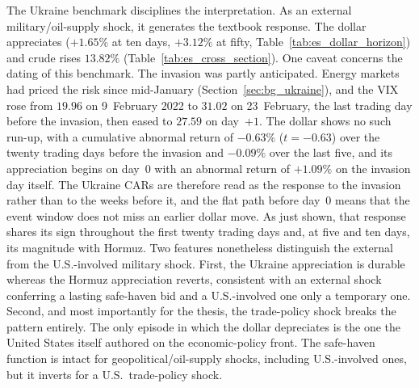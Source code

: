 The Ukraine benchmark disciplines the interpretation. As an external military/oil-supply shock,
it generates the textbook response. The dollar appreciates ($+1.65\%$ at ten days, $+3.12\%$ at fifty, Table~\ref{tab:es_dollar_horizon}) and crude rises $13.82\%$ (Table~\ref{tab:es_cross_section}). One caveat concerns the dating of this benchmark. The invasion was partly anticipated. Energy markets had priced the risk since mid-January (Section~\ref{sec:bg_ukraine}), and the VIX rose from $19.96$ on 9~February 2022 to $31.02$ on 23~February, the last trading day before the invasion, then eased to $27.59$ on day~$+1$. The dollar shows no such run-up, with a cumulative abnormal return of $-0.63\%$ ($t=-0.63$) over the twenty trading days before the invasion and $-0.09\%$ over the last five, and its appreciation begins on day~0 with an abnormal return of $+1.09\%$ on the invasion day itself. The Ukraine CARs are therefore read as the response to the invasion rather than to the weeks before it, and the flat path before day~0 means that the event window does not miss an earlier dollar move. As just shown, that response shares its sign throughout the first twenty trading days and, at
five and ten days, its magnitude with Hormuz. Two features
nonetheless distinguish the external from the U.S.-involved military shock. First, the
Ukraine appreciation is durable whereas the Hormuz appreciation reverts, consistent with
an external shock conferring a lasting safe-haven bid and a U.S.-involved one only a
temporary one. Second, and most importantly for the thesis, the trade-policy shock breaks the pattern entirely. The only episode in which the dollar depreciates is the one the United States itself authored on the economic-policy front. The safe-haven function
is intact for geopolitical/oil-supply shocks, including U.S.-involved ones, but it inverts
for a U.S.\ trade-policy shock.

